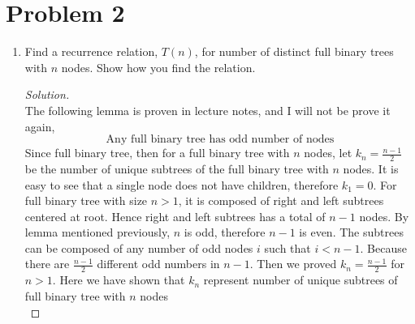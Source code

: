 \documentclass[11pt]{article}
\theoremstyle{plain}%
\theoremstyle{definition}
\theoremstyle{remark}
\newenvironment{solution}
  {\begin{proof}[Solution]}
  {\end{proof}}
\begin{document}
\section*{Problem 2}
\begin{enumerate}
  \item Find a recurrence relation, $T(n)$, for number of distinct full binary trees with $n$ nodes. Show how you find the relation.

  \begin{solution}
    $ $\\
    The following lemma is proven in lecture notes, and I will not be prove it again,
    \[
      \text{Any full binary tree has odd number of nodes}
    \]
    Since full binary tree, then for a full binary tree with $n$ nodes, let $k_n = \frac{n-1}{2}$ be the number of unique subtrees of the full binary tree with $n$ nodes. It is easy to see that a single node does not have children, therefore $k_1 = 0$. For full binary tree with size $n>1$, it is composed of right and left subtrees centered at root. Hence right and left subtrees has a total of $n-1$ nodes. By lemma mentioned previously, $n$ is odd, therefore $n-1$ is even. The subtrees can be composed of any number of odd nodes $i$ such that $i<n-1$. Because there are $\frac{n-1}{2}$ different odd numbers in $n-1$. Then we proved $k_n = \frac{n-1}{2}$ for $n>1$. Here we have shown that $k_n$ represent number of unique subtrees of full binary tree with $n$ nodes\\



\end{solution}
\end{enumerate}
\end{document}

